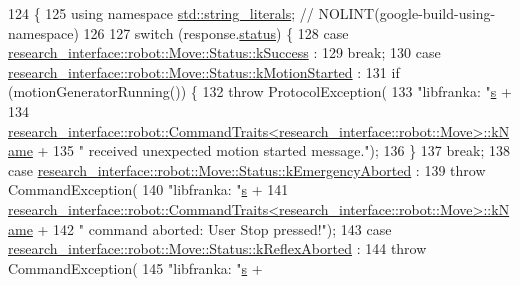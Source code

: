 \begin{DoxyCode}
124                                                                \{
125   \textcolor{keyword}{using namespace }\hyperlink{namespacestd_1_1string__literals}{std::string\_literals};  \textcolor{comment}{// NOLINT(google-build-using-namespace)}
126 
127   \textcolor{keywordflow}{switch} (response.\hyperlink{structresearch__interface_1_1robot_1_1ResponseBase_a99bb821172a0ac77338cd8e0acbe8a96}{status}) \{
128     \textcolor{keywordflow}{case} \hyperlink{structresearch__interface_1_1robot_1_1Move_a74e15d249324a1b2d28f0a7cf50dc794a8c632159fa131f09d04f94e3cbcd8782}{research\_interface::robot::Move::Status::kSuccess}
      :
129       \textcolor{keywordflow}{break};
130     \textcolor{keywordflow}{case} \hyperlink{structresearch__interface_1_1robot_1_1Move_a74e15d249324a1b2d28f0a7cf50dc794a92cc180916fe9d27fd5b9bb7c20727bd}{research\_interface::robot::Move::Status::kMotionStarted}
      :
131       \textcolor{keywordflow}{if} (motionGeneratorRunning()) \{
132         \textcolor{keywordflow}{throw} ProtocolException(
133             \textcolor{stringliteral}{"libfranka: "}\hyperlink{namespaceservice__node__3_aa976421a49e0b54f23833423400849ae}{s} +
134             
      \hyperlink{structresearch__interface_1_1robot_1_1CommandTraits}{research\_interface::robot::CommandTraits<research\_interface::robot::Move>::kName}
       +
135             \textcolor{stringliteral}{" received unexpected motion started message."});
136       \}
137       \textcolor{keywordflow}{break};
138     \textcolor{keywordflow}{case} \hyperlink{structresearch__interface_1_1robot_1_1Move_a74e15d249324a1b2d28f0a7cf50dc794a452811dc518f62ba40861befb68a20cf}{research\_interface::robot::Move::Status::kEmergencyAborted}
      :
139       \textcolor{keywordflow}{throw} CommandException(
140           \textcolor{stringliteral}{"libfranka: "}\hyperlink{namespaceservice__node__3_aa976421a49e0b54f23833423400849ae}{s} +
141           
      \hyperlink{structresearch__interface_1_1robot_1_1CommandTraits}{research\_interface::robot::CommandTraits<research\_interface::robot::Move>::kName}
       +
142           \textcolor{stringliteral}{" command aborted: User Stop pressed!"});
143     \textcolor{keywordflow}{case} \hyperlink{structresearch__interface_1_1robot_1_1Move_a74e15d249324a1b2d28f0a7cf50dc794aedb741f9f460686f7d799eb503d047f1}{research\_interface::robot::Move::Status::kReflexAborted}
      :
144       \textcolor{keywordflow}{throw} CommandException(
145           \textcolor{stringliteral}{"libfranka: "}\hyperlink{namespaceservice__node__3_aa976421a49e0b54f23833423400849ae}{s} +

\end{DoxyCode}
